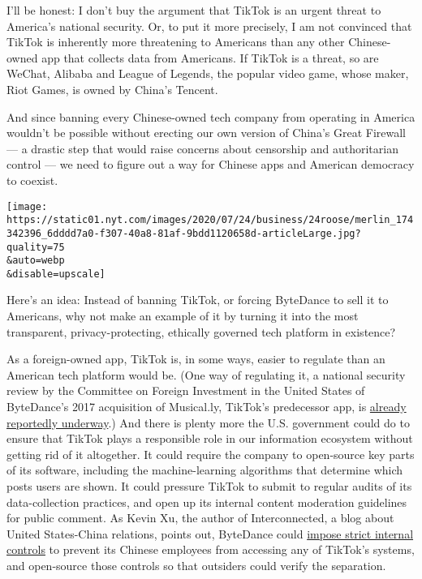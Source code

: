 I'll be honest: I don't buy the argument that TikTok is an urgent threat
to America's national security. Or, to put it more precisely, I am not
convinced that TikTok is inherently more threatening to Americans than
any other Chinese-owned app that collects data from Americans. If TikTok
is a threat, so are WeChat, Alibaba and League of Legends, the popular
video game, whose maker, Riot Games, is owned by China's Tencent.

And since banning every Chinese-owned tech company from operating in
America wouldn't be possible without erecting our own version of China's
Great Firewall --- a drastic step that would raise concerns about
censorship and authoritarian control --- we need to figure out a way for
Chinese apps and American democracy to coexist.

\texttt{[image: https://static01.nyt.com/images/2020/07/24/business/24roose/merlin\_174342396\_6dddd7a0-f307-40a8-81af-9bdd1120658d-articleLarge.jpg?quality=75\\\&auto=webp\\\&disable=upscale]}

Here's an idea: Instead of banning TikTok, or forcing ByteDance to sell
it to Americans, why not make an example of it by turning it into the
most transparent, privacy-protecting, ethically governed tech platform
in existence?

As a foreign-owned app, TikTok is, in some ways, easier to regulate than
an American tech platform would be. (One way of regulating it, a
national security review by the Committee on Foreign Investment in the
United States of ByteDance's 2017 acquisition of Musical.ly, TikTok's
predecessor app, is
\href{https://www.reuters.com/article/us-tiktok-cfius-exclusive/exclusive-u-s-opens-national-security-investigation-into-tiktok-sources-idUSKBN1XB4IL}{already
reportedly underway}.) And there is plenty more the U.S. government
could do to ensure that TikTok plays a responsible role in our
information ecosystem without getting rid of it altogether. It could
require the company to open-source key parts of its software, including
the machine-learning algorithms that determine which posts users are
shown. It could pressure TikTok to submit to regular audits of its
data-collection practices, and open up its internal content moderation
guidelines for public comment. As Kevin Xu, the author of
Interconnected, a blog about United States-China relations, points out,
ByteDance could
\href{https://interconnected.blog/can-bytedance-build-trust/}{impose
strict internal controls} to prevent its Chinese employees from
accessing any of TikTok's systems, and open-source those controls so
that outsiders could verify the separation.

